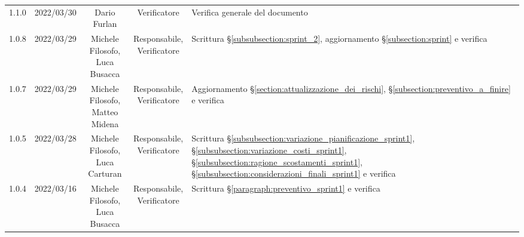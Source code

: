 \begin{center}
\begin{longtable}[c]{c | c | c | c | p{5cm}}
		1.1.0                                                      & 2022/03/30 & Dario Furlan                           & Verificatore   & Verifica generale del documento                                                                                                           \\
		1.0.8                                                      & 2022/03/29 & \Shortunderstack{Michele Filosofo,                                                                                                                                                                  \\Luca Busacca} & \Shortunderstack{Responsabile,\\Verificatore} & Scrittura §\ref{subsubsection:sprint_2}, aggiornamento §\ref{subsection:sprint} e verifica\\
		1.0.7                                                      & 2022/03/29 & \Shortunderstack{Michele Filosofo,                                                                                                                                                                  \\Matteo Midena} & \Shortunderstack{Responsabile,\\Verificatore} & Aggiornamento §\ref{section:attualizzazione_dei_rischi}, §\ref{subsection:preventivo_a_finire} e verifica\\
		1.0.5                                                      & 2022/03/28 & \Shortunderstack{Michele Filosofo,                                                                                                                                                                  \\Luca Carturan} & \Shortunderstack{Responsabile,\\Verificatore} & Scrittura §\ref{subsubsection:variazione_pianificazione_sprint1}, §\ref{subsubsection:variazione_costi_sprint1}, §\ref{subsubsection:ragione_scostamenti_sprint1}, §\ref{subsubsection:considerazioni_finali_sprint1} e verifica\\
		1.0.4                                                      & 2022/03/16 & \Shortunderstack{Michele Filosofo,                                                                                                                                                                  \\Luca Busacca} & \Shortunderstack{Responsabile,\\Verificatore} & Scrittura §\ref{paragraph:preventivo_sprint1} e verifica\\

\end{longtable}
\end{center}
